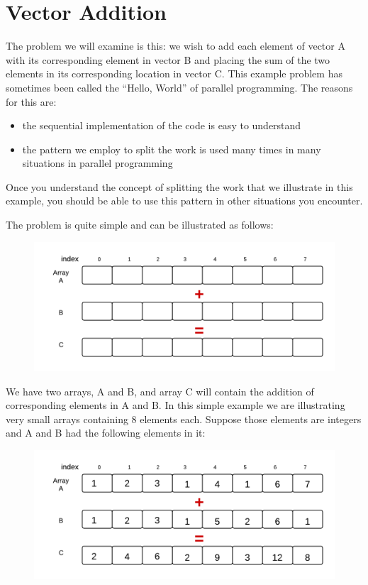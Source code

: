 \documentclass[letterpaper,10pt,openany,oneside]{sphinxmanual}
\begin{document}
\chapter{Vector Addition}
\label{VectorAdd/VectorAddProblem:concept-the-data-decomposition-pattern}\label{VectorAdd/VectorAddProblem::doc}\label{VectorAdd/VectorAddProblem:vector-addition}
The problem we will examine is this: we wish to add each element of vector A with its corresponding element in vector B and placing the sum of the two elements in its corresponding location in vector C.  This example problem has sometimes been called the ``Hello, World'' of parallel programming. The reasons for this are:
\begin{itemize}
\item {} 
the sequential implementation of the code is easy to understand

\item {} 
the pattern we employ to split the work is used many times in many situations in parallel programming

\end{itemize}

Once you understand the concept of splitting the work that we illustrate in this example, you should be able to use this pattern in other situations you encounter.

The problem is quite simple and can be illustrated as follows:
\begin{figure}[htbp]
\centering

\includegraphics{VectorAdditionProblem.png}
\end{figure}

We have two arrays, A and B, and array C will contain the addition of corresponding elements in A and B. In this simple example we are illustrating very small arrays containing 8 elements each.  Suppose those elements are integers and A and B had the following elements in it:
\begin{figure}[htbp]
\centering

\includegraphics{VecAddSolution.png}
\end{figure}
\end{document}
